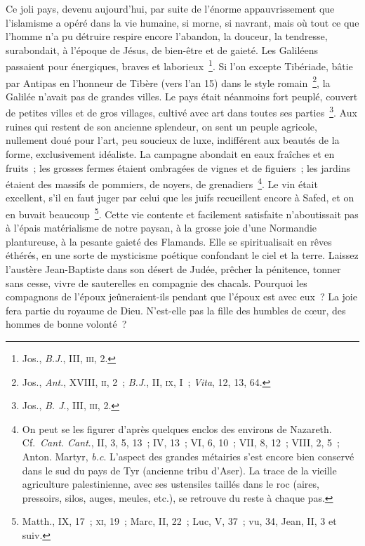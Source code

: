 \documentclass[french,twoside]{book} %
\begin{document}
Ce joli pays, devenu aujourd’hui, par suite de l’énorme appauvrissement que l’islamisme a opéré dans la vie humaine, si morne, si navrant, mais où tout ce que l’homme n’a pu détruire respire encore l’abandon, la douceur, la tendresse, surabondait, à l’époque de Jésus, de bien-être et de gaieté. Les Galiléens passaient pour énergiques, braves et laborieux \footnote{ Jos., {\itshape B.J}., III, \textsc{iii}, 2.}. Si l’on excepte Tibériade, bâtie par Antipas en l’honneur de Tibère (vers l’an 15) dans le style romain \footnote{ Jos., {\itshape Ant}., XVIII, \textsc{ii}, 2 ; {\itshape B.J}., II, \textsc{ix}, I ; {\itshape Vita}, 12, 13, 64.}, la Galilée n’avait pas de grandes villes. Le pays était néanmoins fort peuplé, couvert de petites villes et de gros villages, cultivé avec art dans toutes ses parties \footnote{ Jos., {\itshape B. J}., III, \textsc{iii}, 2.}. Aux ruines qui restent de son ancienne splendeur, on sent un peuple agricole, nullement doué pour l’art, peu soucieux de luxe, indifférent aux beautés de la forme, exclusivement idéaliste. La campagne abondait en eaux fraîches et en fruits ; les grosses fermes étaient ombragées de vignes et de figuiers ; les jardins étaient des massifs de pommiers, de noyers, de grenadiers \footnote{ On peut se les figurer d’après quelques enclos des environs de Nazareth. Cf. {\itshape Cant. Cant}., II, 3, 5, 13 ; IV, 13 ; VI, 6, 10 ; VII, 8, 12 ; VIII, 2, 5 ; Anton. Martyr, {\itshape b.c}. L’aspect des grandes métairies s’est encore bien conservé dans le sud du pays de Tyr (ancienne tribu d’Aser). La trace de la vieille agriculture palestinienne, avec ses ustensiles taillés dans le roc (aires, pressoirs, silos, auges, meules, etc.), se retrouve du reste à chaque pas.}. Le vin était excellent, s’il en faut juger par celui que les juifs recueillent encore à Safed, et on en buvait beaucoup \footnote{ Matth., IX, 17 ; \textsc{xi}, 19 ; Marc, II, 22 ; Luc, V, 37 ; vu, 34, Jean, II, 3 et suiv.}. Cette vie contente et facilement satisfaite n’aboutissait pas à l’épais matérialisme de notre paysan, à la grosse joie d’une Normandie plantureuse, à la pesante gaieté des Flamands. Elle se spiritualisait en rêves éthérés, en une sorte de mysticisme poétique confondant le ciel et la terre. Laissez l’austère Jean-Baptiste dans son désert de Judée, prêcher la pénitence, tonner sans cesse, vivre de sauterelles en compagnie des chacals. Pourquoi les compagnons de l’époux jeûneraient-ils pendant que l’époux est avec eux ? La joie fera partie du royaume de Dieu. N’est-elle pas la fille des humbles de cœur, des hommes de bonne volonté ?\par
\end{document}
